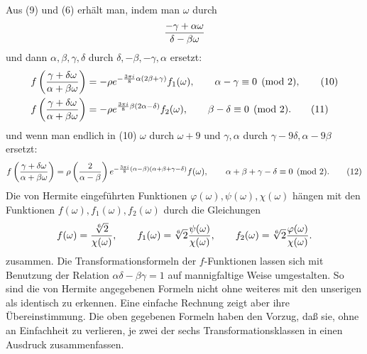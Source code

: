 \documentclass[11pt]{article}
\providecommand{\Jac}[2]{\left(\frac{#1}{#2}\right)}
\begin{document}
Aus (9) und (6) erhält man, indem man $\omega$ durch
\[
{-\gamma+
\alpha\omega\over\delta-
\beta\omega}
\]
und dann $\alpha,\beta,\gamma,\delta$ durch $\delta,-\beta,-\gamma,\alpha$ ersetzt:
\begin{align}
f\left({\gamma+
\delta\omega\over\alpha+
\beta\omega}\right)
&=-\rho e^{-\frac{3\pi i}{8}\alpha(2\beta+
\gamma)}f_1(\omega),
\qquad \alpha-
\gamma\equiv0\pmod2, \tag{10}\\
f\left({\gamma+
\delta\omega\over\alpha+
\beta\omega}\right)
&=-\rho e^{\frac{3\pi i}{8}\beta(2\alpha-
\delta)}f_2(\omega),
\qquad \beta-
\delta\equiv0\pmod2. \tag{11}
\end{align}
und wenn man endlich in (10) $\omega$ durch $\omega+9$ und $\gamma,
\alpha$ durch $\gamma-9\delta,
\alpha-9\beta$ ersetzt:
\begin{equation}
f\left({\gamma+
\delta\omega\over\alpha+
\beta\omega}\right)
=\rho\Jac{2}{\alpha-
\beta}e^{-\frac{3\pi i}{8}(\alpha-
\beta)(\alpha+
\beta+
\gamma-
\delta)}f(\omega),
\qquad \alpha+
\beta+
\gamma-
\delta\equiv0\pmod2. 
\tag{12}
\end{equation}
Die von Hermite eingeführten Funktionen $\varphi(\omega),\psi(\omega),\chi(\omega)$ hängen mit den Funktionen $f(\omega),f_1(\omega),f_2(\omega)$ durch die Gleichungen
\[
f(\omega)={\sqrt[6]{2}\over\chi(\omega)},
\qquad
f_1(\omega)=\sqrt[6]{2}{\psi(\omega)\over\chi(\omega)},
\qquad
f_2(\omega)=\sqrt[6]{2}{\varphi(\omega)\over\chi(\omega)}.
\]
zusammen. Die Transformationsformeln der $f$-Funktionen lassen sich mit Benutzung der Relation $\alpha\delta-\beta\gamma=1$ auf mannigfaltige Weise umgestalten. So sind die von Hermite angegebenen Formeln nicht ohne weiteres mit den unserigen als identisch zu erkennen. Eine einfache Rechnung zeigt aber ihre Übereinstimmung. Die oben gegebenen Formeln haben den Vorzug, daß sie, ohne an Einfachheit zu verlieren, je zwei der sechs Transformationsklassen in einen Ausdruck zusammenfassen.
\end{document}
